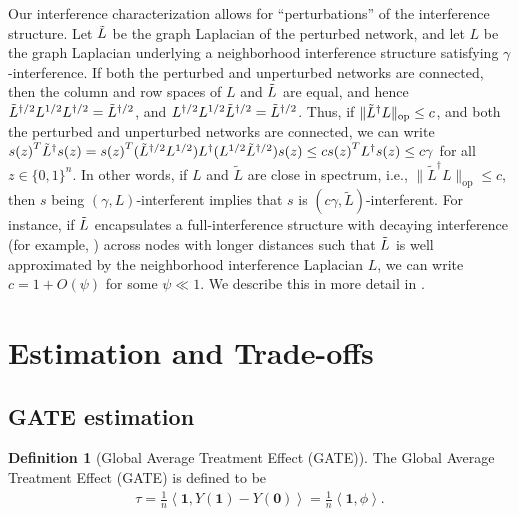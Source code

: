 \documentclass[12pt]{article}
\theoremstyle{definition}
\newtheorem{definition}{Definition}
\numberwithin{equation}{section}
\numberwithin{figure}{section}
\newcommand\dotp[1]{\left\langle #1 \right\rangle}
\newcommand{\calN}{{\mathcal N}}
\numberwithin{equation}{section}
\numberwithin{figure}{section}
\begin{document}
\begin{example} \label{example:noisy_interference}
Our interference characterization allows for ``perturbations'' of the interference structure. Let $\Tilde{L}$ be the graph Laplacian of the perturbed network, and let $L$ be the graph Laplacian underlying a neighborhood interference structure satisfying $\gamma$-interference. If both the perturbed and unperturbed networks are connected, then the column and row spaces of $L$ and $\Tilde{L}$ are equal, and hence $\Tilde{L}^{\dagger/2} L^{1/2} L^{\dagger/2} = \Tilde{L}^{\dagger/2}$, and $L^{\dagger/2} L^{1/2} \Tilde{L}^{\dagger/2} = \Tilde{L}^{\dagger/2}$. Thus, if $\|\Tilde{L}^{\dagger} L \|_{\text{op}}\leq c$, and both the perturbed and unperturbed networks are connected, we can write ${s(z)}^T \Tilde{L}^\dagger s(z) = {s(z)}^T (\Tilde{L}^{\dagger/2} L^{1/2}) L^{\dagger} (L^{1/2} \Tilde{L}^{\dagger/2}) s(z) \leq c  {s(z)}^T L^\dagger s(z) \leq c \gamma$ for all $z \in \{0,1\}^n$.
In other words, if $L$ and $\tilde{L}$ are close in spectrum, i.e., $\|\tilde{L}^\dagger L \|_{\text{op}} \leq c$, then $s$ being $(\gamma, L)$-interferent implies that $s$ is $ (c\gamma, \tilde{L})$-interferent. For instance, if $\Tilde{L}$ encapsulates a full-interference structure with decaying interference (for example, \citet{leung2022causal}) across nodes with longer distances such that $\Tilde{L}$ is well approximated by the neighborhood interference Laplacian $L$,
we can write $c = 1 + O(\psi)$ for some $\psi \ll 1$. We describe this in more detail in .
\end{example}

\section{Estimation and Trade-offs} \label{section_mse_bound}

\subsection{GATE estimation}  \label{gate_estimation}

\begin{definition}[Global Average Treatment Effect (GATE)] \label{def:gate}
The Global Average Treatment Effect (GATE) is defined to be
\begin{align*}
    \tau = \frac{1}{n} \dotp{\mathbf{1},Y(\mathbf{1}) - Y(\mathbf{0}) }  = \frac{1}{n} \dotp{\mathbf{1}, \phi}.
\end{align*}
\end{definition}
\end{document}
